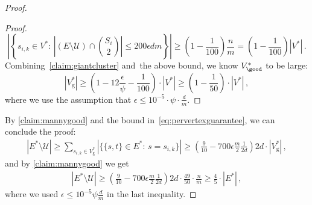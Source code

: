 \begin{proof}
\begin{proof}
\begin{equation}
			\left|\left\{s_{i,k} \in V^* : \, \left|(E \setminus \mathcal{U}) \cap \binom{S_i}{2}\right| \le {200\epsilon}dm \right\}\right| \ge \left(1-\frac{1}{100}\right)\frac{n}{m}= \left(1-\frac{1}{100}\right)|V^*| \, .
		\end{equation}
		Combining~\cref{claim:giantcluster} and~the above bound, we know $V^*_{\good}$ to be large:
		\begin{equation*}
			|V^*_{\text{g}}| \ge \left(1-12\frac{\epsilon}{\psi}-\frac{1}{100}\right) \cdot |V^*| \ge \left(1-\frac{1}{50}\right) \cdot |V^*| \, ,
		\end{equation*}
		where we use the assumption that $\epsilon \le 10^{-5} \cdot \psi \cdot \frac{d}{m}$.
	\end{proof}
\noindent
	By \cref{claim:mannygood} and the bound in~\eqref{eq:pervertexguarantee}, we can conclude the proof:
	\begin{align*}
		|E^*  \setminus \mathcal{U}| \ge \sum_{s_{i,k} \in V^*_{\text{g}}} |\{\{s,t\} \in E^* : \, s = s_{i,k}\}|   \ge   \left(\frac{9}{10} - 700{\epsilon} \frac{m}{2}\frac{1}{2d}\right)2d \cdot |V^*_{\text{g}}| \, ,
	\end{align*}
	and by \cref{claim:mannygood} we get
	\begin{align*}
	|E^*  \setminus \mathcal{U}|  \ge  \left(\frac{9}{10} - 700{\epsilon}\frac{m}{2}\frac{1}{2d}\right)2d \cdot \frac{49}{50} \cdot \frac{n}{m}  \ge \frac{4}{5} \cdot |E^*|  \, ,
	\end{align*}
	where we used $\epsilon \le 10^{-5} \psi \frac{d}{m}$ in the last inequality.
\end{proof}

